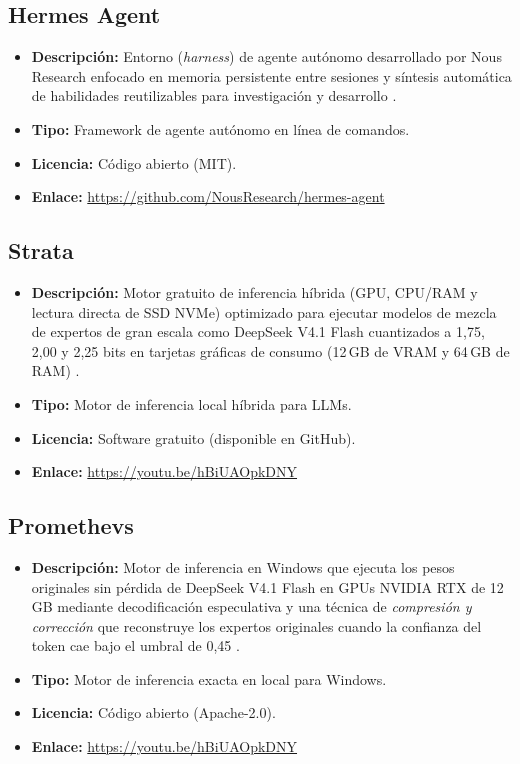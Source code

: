 \documentclass[conference,twocolumn,spanish]{IEEEtran}
\begin{document}
\subsection{Hermes Agent}
\begin{itemize}
    \item \textbf{Descripción:} Entorno (\textit{harness}) de agente autónomo desarrollado por Nous Research enfocado en memoria persistente entre sesiones y síntesis automática de habilidades reutilizables para investigación y desarrollo \cite{datacamp_harnesses_2026}.
    \item \textbf{Tipo:} Framework de agente autónomo en línea de comandos.
    \item \textbf{Licencia:} Código abierto (MIT).
    \item \textbf{Enlace:} \url{https://github.com/NousResearch/hermes-agent}
\end{itemize}

\subsection{Strata}
\begin{itemize}
    \item \textbf{Descripción:} Motor gratuito de inferencia híbrida (GPU, CPU/RAM y lectura directa de SSD NVMe) optimizado para ejecutar modelos de mezcla de expertos de gran escala como DeepSeek V4.1 Flash cuantizados a 1,75, 2,00 y 2,25 bits en tarjetas gráficas de consumo (12\,GB de VRAM y 64\,GB de RAM) \cite{marfil_deepseek_2026}.
    \item \textbf{Tipo:} Motor de inferencia local híbrida para LLMs.
    \item \textbf{Licencia:} Software gratuito (disponible en GitHub).
    \item \textbf{Enlace:} \url{https://youtu.be/hBiUAOpkDNY}
\end{itemize}

\subsection{Promethevs}
\begin{itemize}
    \item \textbf{Descripción:} Motor de inferencia en Windows que ejecuta los pesos originales sin pérdida de DeepSeek V4.1 Flash en GPUs NVIDIA RTX de 12\,GB mediante decodificación especulativa y una técnica de \textit{compresión y corrección} que reconstruye los expertos originales cuando la confianza del token cae bajo el umbral de 0,45 \cite{marfil_deepseek_2026}.
    \item \textbf{Tipo:} Motor de inferencia exacta en local para Windows.
    \item \textbf{Licencia:} Código abierto (Apache-2.0).
    \item \textbf{Enlace:} \url{https://youtu.be/hBiUAOpkDNY}
\end{itemize}
\end{document}
